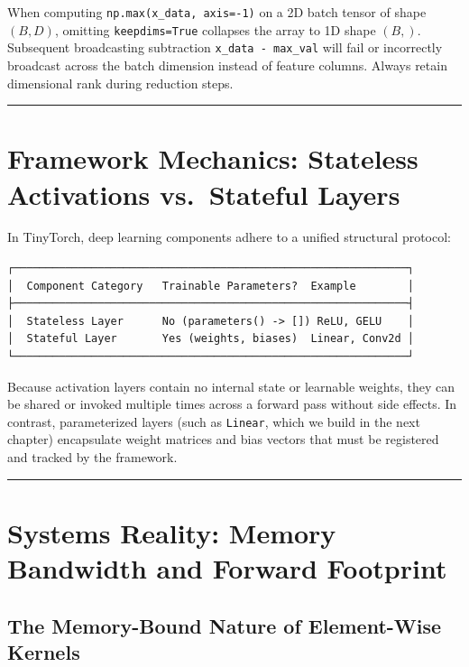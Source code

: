\documentclass[
  letterpaper,
]{scrbook}
\begin{document}
When computing \texttt{np.max(x\_data,\ axis=-1)} on a 2D batch tensor
of shape \((B, D)\), omitting \texttt{keepdims=True} collapses the array
to 1D shape \((B,)\). Subsequent broadcasting subtraction
\texttt{x\_data\ -\ max\_val} will fail or incorrectly broadcast across
the batch dimension instead of feature columns. Always retain
dimensional rank during reduction steps.

\begin{center}\rule{0.5\linewidth}{0.5pt}\end{center}

\section{Framework Mechanics: Stateless Activations vs.~Stateful
Layers}\label{framework-mechanics-stateless-activations-vs.-stateful-layers}

In TinyTorch, deep learning components adhere to a unified structural
protocol:

\begin{verbatim}
┌─────────────────────────────────────────────────────────────┐
│  Component Category   Trainable Parameters?  Example        │
├─────────────────────────────────────────────────────────────┤
│  Stateless Layer      No (parameters() -> []) ReLU, GELU    │
│  Stateful Layer       Yes (weights, biases)  Linear, Conv2d │
└─────────────────────────────────────────────────────────────┘
\end{verbatim}

Because activation layers contain no internal state or learnable
weights, they can be shared or invoked multiple times across a forward
pass without side effects. In contrast, parameterized layers (such as
\texttt{Linear}, which we build in the next chapter) encapsulate weight
matrices and bias vectors that must be registered and tracked by the
framework.

\begin{center}\rule{0.5\linewidth}{0.5pt}\end{center}

\section{Systems Reality: Memory Bandwidth and Forward
Footprint}\label{systems-reality-memory-bandwidth-and-forward-footprint}

\subsection{The Memory-Bound Nature of Element-Wise
Kernels}\label{the-memory-bound-nature-of-element-wise-kernels}
\end{document}
